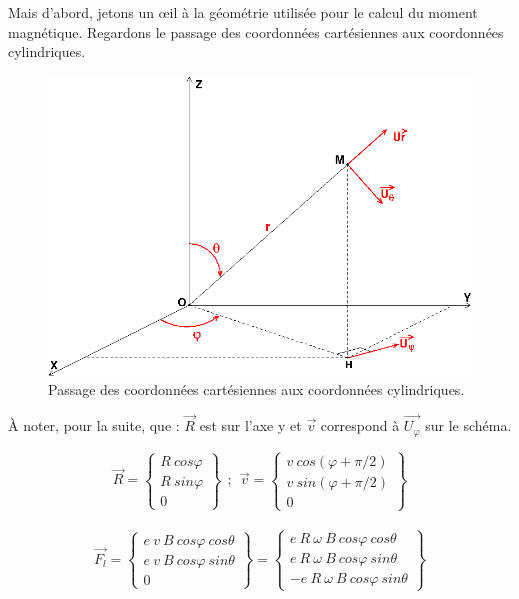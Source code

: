 \documentclass[12pt,a4paper,titlepage]{book}
\begin{document}
Mais d'abord, jetons un \oe{}il à la géométrie utilisée pour le calcul du moment magnétique. Regardons le passage des coordonnées cartésiennes aux coordonnées cylindriques.\\

\begin{figure}[!h]
\begin{center}
\includegraphics[scale=0.5]{cartesienne_a_cylindriques.png}
\caption{Passage des coordonnées cartésiennes aux coordonnées cylindriques.}
\label{coord1}
\end{center}
\end{figure}

\begin{center}
À noter, pour la suite, que : $\overrightarrow{R}$ est sur l'axe y et $\overrightarrow{v}$ correspond à $\overrightarrow{U_\varphi}$ sur le schéma.
\end{center}

\begin{center}
\[
\overrightarrow{R} = 
\left\lbrace
\begin{matrix}
R ~cos \varphi\\
R ~sin \varphi\\
0
\end{matrix}
\right\rbrace
~~;~~ \overrightarrow{v} =
\left\lbrace
\begin{matrix}
v ~cos (\varphi + \pi /2)\\
v ~sin (\varphi + \pi /2)\\
0
\end{matrix}
\right\rbrace
\]\\

\[
\overrightarrow{F_l} =
\left\lbrace
\begin{matrix}
e ~v ~B ~cos \varphi ~cos \theta\\
e ~v ~B ~cos \varphi ~sin \theta\\
0
\end{matrix}
\right\rbrace
=
\left\lbrace
\begin{matrix}
e ~R ~\omega ~B ~cos \varphi ~cos \theta\\
e ~R ~\omega ~B ~cos \varphi ~sin \theta\\
-e ~R ~\omega ~B ~cos \varphi ~sin \theta
\end{matrix}
\right\rbrace
\]
\end{center}
\end{document}
